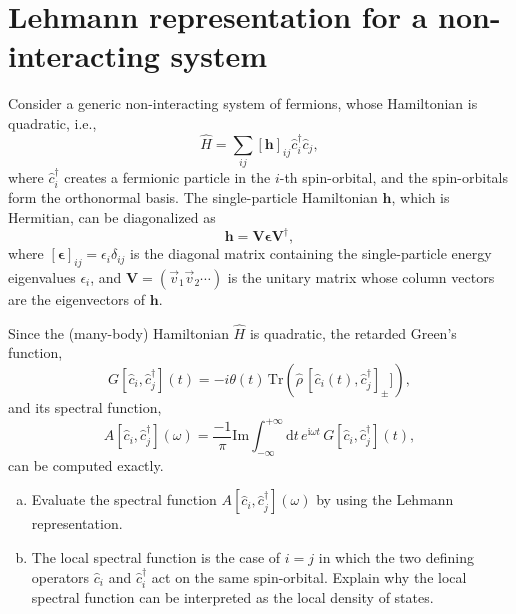 \documentclass[11pt,a4paper,oneside]{article}
\begin{document}
\section*{Lehmann representation for a non-interacting system}

Consider a generic non-interacting system of fermions, whose Hamiltonian is quadratic, i.e.,
\begin{equation}
\hat{H} = \sum_{ij} [ \boldsymbol{h} ]_{ij} \hat{c}_{i}^\dagger \hat{c}_{j} ,
\end{equation}
where $\hat{c}_{i}^\dagger$ creates a fermionic particle in the $i$-th spin-orbital, and the spin-orbitals form the orthonormal basis.
The single-particle Hamiltonian $\boldsymbol{h}$, which is Hermitian, can be diagonalized as
\begin{equation}
\boldsymbol{h} = \boldsymbol{V} \boldsymbol{\epsilon} \boldsymbol{V}^\dagger,
\end{equation}
where $[\boldsymbol{\epsilon}]_{ij} = \epsilon_i \delta_{ij}$ is the diagonal matrix containing the single-particle energy eigenvalues $\epsilon_i$,
and $\boldsymbol{V} = ( \vec{v}_1 \vec{v}_2 \cdots )$ is the unitary matrix whose column vectors are the eigenvectors of $\boldsymbol{h}$.

Since the (many-body) Hamiltonian $\hat{H}$ is quadratic, the retarded Green's function,
\begin{equation}
G[\hat{c}_i, \hat{c}_j^\dagger] (t) = -i \theta (t) \, \mathrm{Tr}\!\left( \hat{\rho} \, [ \hat{c}_i (t), \hat{c}_j^\dagger ]_\pm ] \right),
\end{equation}
and its spectral function,
\begin{equation}
A[\hat{c}_i, \hat{c}_j^\dagger] (\omega) = \frac{-1}{\pi} \mathrm{Im} \int_{-\infty}^{+\infty} \mathrm{d}t \, e^{\mathrm{i} \omega t} \, G[\hat{c}_i, \hat{c}_j^\dagger] (t),
\end{equation}
can be computed exactly.

\begin{enumerate}[(a)]

\item
Evaluate the spectral function $A[\hat{c}_i, \hat{c}_j^\dagger] (\omega)$ by using the Lehmann representation.

\item
The local spectral function is the case of $i = j$ in which the two defining operators $\hat{c}_i$ and $\hat{c}_i^\dagger$ act on the same spin-orbital.
Explain why the local spectral function can be interpreted as the local density of states.

\end{enumerate}
\end{document}
